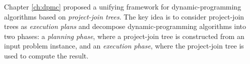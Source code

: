 


Chapter \ref{ch:dpmc} proposed a unifying framework for dynamic-programming algorithms based on \emph{project-join trees}. 
The key idea is to consider project-join trees as \emph{execution plans} and decompose dynamic-programming algorithms into two phases: a \emph{planning phase}, where a project-join tree is constructed from an input problem instance, and an \emph{execution phase}, where the project-join tree is used to compute the result. 


